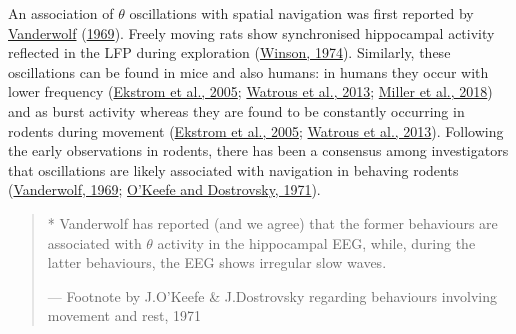 \documentclass[
  12pt,
  a4paper,
  openany]{book}
\begin{document}
\noindent
An association of \(\theta\) oscillations with spatial navigation was first reported by \protect\hyperlink{ref-vanderwolf_hippocampal_1969}{Vanderwolf} (\protect\hyperlink{ref-vanderwolf_hippocampal_1969}{1969}). Freely moving rats show synchronised hippocampal activity reflected in the LFP during exploration (\protect\hyperlink{ref-winson_patterns_1974}{Winson, 1974}). Similarly, these oscillations can be found in mice and also humans: in humans they occur with lower frequency (\protect\hyperlink{ref-ekstrom_human_2005}{Ekstrom et al., 2005}; \protect\hyperlink{ref-watrous_comparative_2013}{Watrous et al., 2013}; \protect\hyperlink{ref-miller_lateralized_2018}{Miller et al., 2018}) and as burst activity whereas they are found to be constantly occurring in rodents during movement (\protect\hyperlink{ref-ekstrom_human_2005}{Ekstrom et al., 2005}; \protect\hyperlink{ref-watrous_comparative_2013}{Watrous et al., 2013}). Following the early observations in rodents, there has been a consensus among investigators that oscillations are likely associated with navigation in behaving rodents (\protect\hyperlink{ref-vanderwolf_hippocampal_1969}{Vanderwolf, 1969}; \protect\hyperlink{ref-okeefe_hippocampus_1971}{O'Keefe and Dostrovsky, 1971}).





\begin{quote}
* Vanderwolf has reported (and we agree) that the former behaviours are associated with \(\theta\) activity in the hippocampal EEG, while, during the latter behaviours, the EEG shows irregular slow waves.

\hfill --- Footnote by J.O'Keefe \& J.Dostrovsky regarding behaviours involving movement and rest, 1971
\end{quote}
\end{document}
